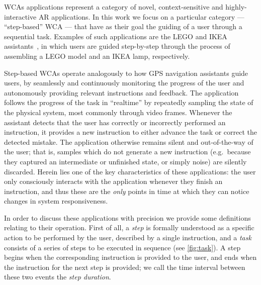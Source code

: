 \glspl{WCA} applications represent a category of novel, context-sensitive and highly-interactive \gls{AR} applications.
In this work we focus on a particular category --- ``step-based'' \gls{WCA} --- that have as their goal the guiding of a user through a sequential task.
Examples of such applications are the LEGO and IKEA assistants~\cite{chen2015early,chen2018application}, in which users are guided step-by-step through the process of assembling a LEGO model and an IKEA lamp, respectively.

Step-based \glspl{WCA} operate analogously to how \gls{GPS} navigation assistants guide users, by seamlessly and continuously monitoring the progress of the user and autonomously providing relevant instructions and feedback.
The application follows the progress of the task in ``realtime'' by repeatedly sampling the state of the physical system, most commonly through video frames.
Whenever the assistant detects that the user has correctly or incorrectly performed an instruction, it provides a new instruction to either advance the task or correct the detected mistake.
The application otherwise remains silent and out-of-the-way of the user;
that is, samples which do not generate a new instruction (e.g.~because they captured an intermediate or unfinished state, or simply noise) are silently discarded.
Herein lies one of the key characteristics of these applications: the user only consciously interacts with the application whenever they finish an instruction, and thus these are the \emph{only} points in time at which they can notice changes in system responsiveness.

In order to discuss these applications with precision we provide some definitions relating to their operation.
First of all, a \emph{step} is formally understood as a specific action to be performed by the user, described by a single instruction, and a \emph{task} consists of a series of steps to be executed in sequence (see \cref{fig:task}).
A step begins when the corresponding instruction is provided to the user, and ends when the instruction for the next step is provided; we call the time interval between these two events the \emph{step duration}.

